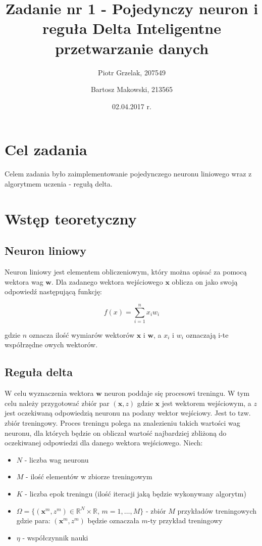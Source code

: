 \documentclass[12pt]{article}
\title{{\bf Zadanie nr 1 - Pojedynczy neuron i reguła Delta}\linebreak
Inteligentne przetwarzanie danych}
\author{Piotr Grzelak, 207549 \and Bartosz Makowski, 213565}
\date{02.04.2017 r.}
\begin{document}
\clearpage\maketitle
\thispagestyle{empty}
\newpage
\setcounter{page}{1}
\section{Cel zadania}

Celem zadania było zaimplementowanie pojedynczego neuronu liniowego wraz z algorytmem uczenia - regułą delta.

\section{Wstęp teoretyczny}

\subsection{Neuron liniowy}

Neuron liniowy jest elementem obliczeniowym, który można opisać za pomocą wektora wag $\textbf{w}$. Dla zadanego wektora wejściowego $\textbf{x}$ oblicza on jako swoją odpowiedź następującą funkcję:

\[ f(x) = \sum_{i=1}^n x_i w_i \]

gdzie $n$ oznacza ilość wymiarów wektorów $\textbf{x}$ i $\textbf{w}$, a $x_i$ i $w_i$ oznaczają i-te współrzędne owych wektorów.

\subsection{Reguła delta}

W celu wyznaczenia wektora $\textbf{w}$ neuron poddaje się procesowi treningu. W tym celu należy przygotować zbiór par $(\textbf{x}, z)$ gdzie $\textbf{x}$ jest wektorem wejściowym, a $z$ jest oczekiwaną odpowiedzią neuronu na podany wektor wejściowy. Jest to tzw. zbiór treningowy. Proces treningu polega na znalezieniu takich wartości wag neuronu, dla których będzie on obliczał wartość najbardziej zbliżoną do oczekiwanej odpowiedzi dla danego wektora wejściowego. Niech:

\begin{itemize}
\item $N$ - liczba wag neuronu
\item $M$ - ilość elementów w zbiorze treningowym
\item $K$ - liczba epok treningu (ilość iteracji jaką będzie wykonywany algorytm)
\item $\Omega=\lbrace(\textbf{x}^m, z^m) \in \mathbb{R}^N \times \mathbb{R}, \, m=1, \ldots , M \rbrace$ - zbiór $M$ przykładów treningowych gdzie para: $(\textbf{x}^m, z^m)$ będzie oznaczała $m$-ty przykład treningowy
\item $\eta$ - współczynnik nauki
\end{itemize}
\end{document}
